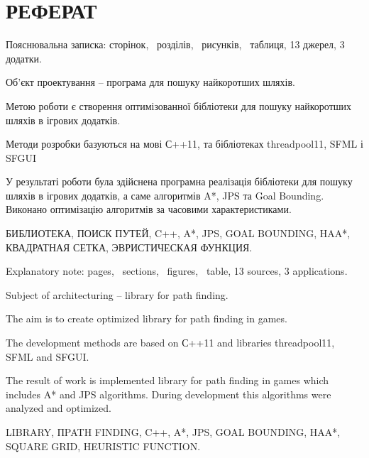 \section*{РЕФЕРАТ}

\vspace{1\baselineskip}

\thispagestyle{empty}

Пояснювальна записка: \pageref{LastPage} сторінок, \totalsections\ розділів,  \totalfigures\ рисунків, \totaltables\ таблиця, 13 джерел, 3 додатки.

Об'єкт проектування -- програма для пошуку найкоротших шляхів.

Метою роботи є створення оптимізованної бібліотеки для пошуку найкоротших шляхів в ігрових додатків.

Методи розробки базуються на мові С++11, та бібліотеках threadpool11, SFML і SFGUI

У результаті роботи була здійснена програмна реалізація бібліотеки для пошуку шляхів в ігрових додатків, а саме алгоритмів A*, JPS та Goal Bounding. Виконано оптимізацію алгоритмів за
часовими характеристиками.

БИБЛИОТЕКА, ПОИСК ПУТЕЙ, C++, A*, JPS, GOAL BOUNDING, HAA*, КВАДРАТНАЯ СЕТКА, ЭВРИСТИЧЕСКАЯ ФУНКЦИЯ.

\vspace{1\baselineskip}

Explanatory note: \pageref{LastPage} pages, \totalsections\ sections,  \totalfigures\ figures, \totaltables\ table, 13 sources, 3 applications.

Subject of architecturing -- library for path finding.

The aim is to create optimized library for path finding in games.

The development methods are based on С++11 and libraries threadpool11, SFML and SFGUI.

The result of work is implemented library for path finding in games which includes A* and JPS algorithms. During development this algorithms were analyzed and optimized.

LIBRARY, ПPATH FINDING, C++, A*, JPS, GOAL BOUNDING, HAA*, SQUARE GRID, HEURISTIC FUNCTION.
